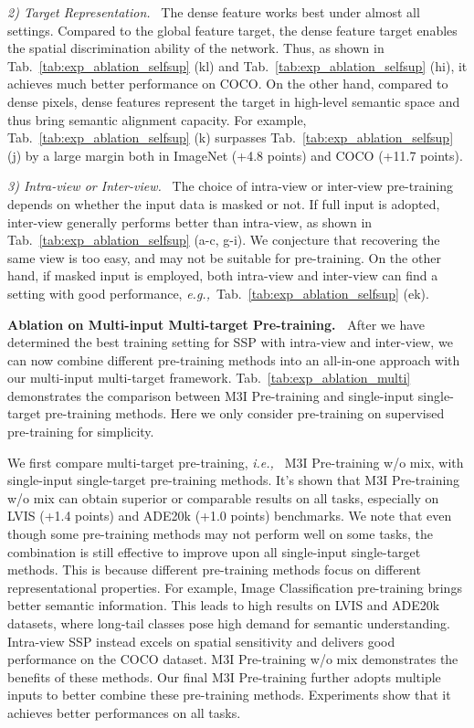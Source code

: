 \documentclass[10pt,twocolumn,letterpaper]{article}
\def\eg{\textit{e.g.,~}}
\def\ie{\textit{i.e.,~}}
\def\name{M3I Pre-training}
\begin{document}
\noindent\emph{2) Target Representation.~} The dense feature works best under almost all settings. Compared to the global feature target, the dense feature target enables the spatial discrimination ability of the network. Thus, as shown in Tab.~\ref{tab:exp_ablation_selfsup} (kl) and Tab.~\ref{tab:exp_ablation_selfsup} (hi), it achieves much better performance on COCO. On the other hand, compared to dense pixels, dense features represent the target in high-level semantic space and thus bring semantic alignment capacity. For example, Tab.~\ref{tab:exp_ablation_selfsup} (k) surpasses Tab.~\ref{tab:exp_ablation_selfsup} (j) by a large margin both in ImageNet (+4.8 points) and COCO (+11.7 points).

\noindent\emph{3) Intra-view or Inter-view.~}
The choice of intra-view or inter-view pre-training depends on whether the input data is masked or not. If full input is adopted, inter-view generally performs better than intra-view, as shown in Tab.~\ref{tab:exp_ablation_selfsup} (a-c, g-i). We conjecture that recovering the same view is too easy, and may not be suitable for pre-training.
On the other hand, if masked input is employed, both intra-view and inter-view can find a setting with good performance, \eg Tab.~\ref{tab:exp_ablation_selfsup} (ek). 



\vspace{0.5em}\noindent\textbf{Ablation on Multi-input Multi-target Pre-training.~} After we have determined the best training setting for SSP with intra-view and inter-view, we can now combine different pre-training methods into an all-in-one approach with our multi-input multi-target framework. Tab.~\ref{tab:exp_ablation_multi} demonstrates the comparison between \name{} and single-input single-target pre-training methods. Here we only consider pre-training on supervised pre-training for simplicity. 


We first compare multi-target pre-training, \ie{} \name{} w/o mix, with single-input single-target pre-training methods. It's shown that \name{} w/o mix can obtain superior or comparable results on all tasks, especially on LVIS (+1.4 points) and ADE20k (+1.0 points) benchmarks. We note that even though some pre-training methods may not perform well on some tasks, the combination is still effective to improve upon all single-input single-target methods. This is because different pre-training methods focus on different representational properties. For example, Image Classification pre-training brings better semantic information. This leads to high results on LVIS and ADE20k datasets, where long-tail classes pose high demand for semantic understanding. Intra-view SSP instead excels on spatial sensitivity and delivers good performance on the COCO dataset. \name{} w/o mix demonstrates the benefits of these methods. Our final \name{} further adopts multiple inputs to better combine these pre-training methods. Experiments show that it achieves better performances on all tasks.
\end{document}
